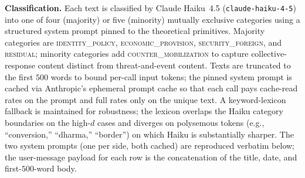 \textbf{Classification.} Each text is classified by Claude Haiku~4.5
(\texttt{claude-haiku-4-5}) into one of four (majority) or five (minority)
mutually exclusive categories using a structured system prompt pinned to the
theoretical primitives. Majority categories are \textsc{identity\_policy},
\textsc{economic\_provision}, \textsc{security\_foreign}, and
\textsc{residual}; minority categories add \textsc{counter\_mobilization}
to capture collective-response content distinct from threat-and-event
content. Texts are truncated to the first $500$ words to bound per-call
input tokens; the pinned system prompt is cached via Anthropic's ephemeral
prompt cache so that each call pays cache-read rates on the prompt and full
rates only on the unique text. A keyword-lexicon fallback is maintained for
robustness; the lexicon overlaps the Haiku category boundaries on the
high-$d$ cases and diverges on polysemous tokens (e.g., ``conversion,''
``dharma,'' ``border'') on which Haiku is substantially sharper. The two
system prompts (one per side, both cached) are reproduced verbatim below;
the user-message payload for each row is the concatenation of the title,
date, and first-$500$-word body.

